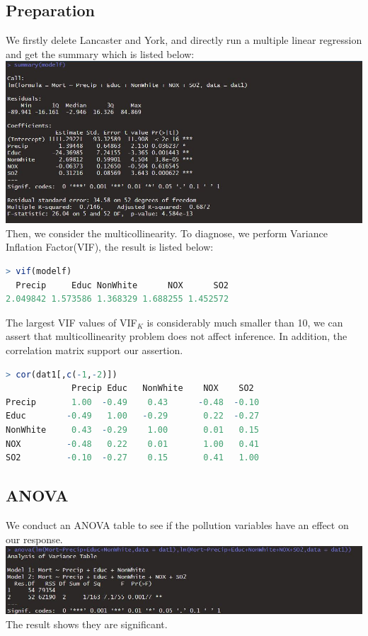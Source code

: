 \documentclass[12pt,a4paper]{article}
\begin{document}
\subsection{Preparation}
We firstly delete Lancaster and York, and directly run a multiple linear regression and get the summary  which is listed below:
\newline
\includegraphics[scale=0.6]{all.JPG}
\newline
Then, we consider the multicollinearity. To diagnose, we perform Variance Inflation Factor(VIF), the result is listed below:
\newline
\begin{lstlisting}[language=R]
> vif(modelf)
  Precip     Educ NonWhite      NOX      SO2 
2.049842 1.573586 1.368329 1.688255 1.452572 
\end{lstlisting}
The largest VIF values of VIF$_K$ is considerably much smaller than 10, we can assert that multicollinearity problem does not affect inference. In addition, the correlation matrix support our assertion.
\begin{lstlisting}[language=R]
> cor(dat1[,c(-1,-2)])
             Precip Educ   NonWhite    NOX    SO2
Precip       1.00  -0.49    0.43      -0.48  -0.10
Educ        -0.49   1.00   -0.29       0.22  -0.27
NonWhite     0.43  -0.29    1.00       0.01   0.15
NOX         -0.48   0.22    0.01       1.00   0.41
SO2         -0.10  -0.27    0.15       0.41   1.00
\end{lstlisting}
\subsection{ANOVA}
We conduct an ANOVA table to see if the pollution variables have an effect on our response. \\
\includegraphics[scale=0.6]{ANOVA.JPG}
\newline
The result shows they are significant.
\end{document}
